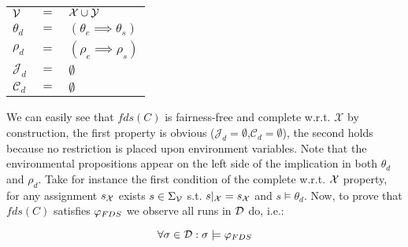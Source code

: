 \begin{tabular}{ l c l }
	${\mathcal{V}}$ & $=$ & ${\mathcal{X}} \cup {\mathcal{Y}}$\\	
	$\theta_d$ & $=$ & $(\theta_e \implies \theta_s)$\\
	$\rho_d$ & $=$ & $(\rho_e \implies \rho_s)$\\	
	$\mathcal{J}_d$ & $=$ & $\emptyset$\\
	$\mathcal{C}_d$ & $=$ & $\emptyset$\\
\end{tabular}

We can easily see that $fds(C)$ is fairness-free and complete w.r.t. $\mathcal{X}$ by construction, the first property is obvious ($\mathcal{J}_d=\emptyset$,$\mathcal{C}_d=\emptyset$), the second holds because no restriction is placed upon environment variables. Note that the environmental propositions appear on the left side of the implication in both $\theta_d$ and $\rho_d$. Take for instance the first condition of the complete w.r.t. ${\mathcal{X}}$ property, for any assignment $s_{{\mathcal{X}}}$ exists $s \in \Sigma_{{\mathcal{V}}}$ s.t. $s|_{{\mathcal{X}}}=s_{{\mathcal{X}}}$ and $s \models \theta_d$. Now, to prove that $fds(C)$ satisfies $\varphi_{FDS}$ we observe all runs in $\mathcal{D}$ do, i.e.: 

\[\forall \sigma \in \mathcal{D}: \sigma \models \varphi_{FDS} \]

